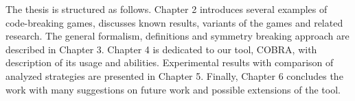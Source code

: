 The thesis is structured as follows.
Chapter 2 introduces several examples of code-breaking games,
  discusses known results, variants of the games and related research.
The general formalism, definitions and symmetry breaking approach
  are described in Chapter 3.
Chapter 4 is dedicated to our tool, COBRA, with description of its usage and
  abilities.
Experimental results with comparison of analyzed strategies are presented in Chapter 5.
Finally, Chapter 6 concludes the work with many suggestions on future work
  and possible extensions of the tool.






